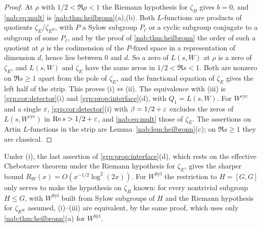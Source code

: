 \begin{proof}
At $\rho$ with $1/2<\Re\rho<1$ the Riemann hypothesis for $\zeta_B$ gives $b=0$, and
\eqref{nab:eq:mult} is \cref{nab:thm:heilbronn}(a),(b). Both $L$-functions are products of
quotients $\zeta_E/\zeta_{E^P}$, with $P$ a Sylow subgroup $P_\ell$ or a cyclic subgroup
conjugate to a subgroup of some $P_\ell$, and by the proof of \cref{nab:thm:heilbronn} the order of such a quotient at
$\rho$ is the codimension of the $P$-fixed space in a representation of dimension $d$,
hence lies between $0$ and $d$. So a zero of $L(s,W)$ at $\rho$ is a zero of $\zeta_E$, and
$L(s,W)$ and $\zeta_E$ have the same zeros in $1/2<\Re s<1$. Both are nonzero on $\Re s\ge1$
apart from the pole of $\zeta_E$, and the functional equation of $\zeta_E$ gives the left
half of the strip. This proves (i)$\Leftrightarrow$(ii). The equivalence with (iii) is
\cref{grp:cor:detector}(i) and \cref{grp:prop:interface}(d), with $Q_1=L(s,W)$. For
$W^{\mathrm{cyc}}$ and a single $\varepsilon$, \cref{grp:cor:detector}(i) with $\beta=1/2+\varepsilon$
excludes the zeros of
$L(s,W^{\mathrm{cyc}})$ in $\operatorname{Re} s>1/2+\varepsilon$, and \eqref{nab:eq:mult} those of $\zeta_E$. The
assertions on Artin $L$-functions in the strip are Lemma~\ref{nab:lem:heilbronn}(c); on
$\Re s\ge1$ they are classical.
\end{proof}

Under (i), the last assertion of \cref{grp:prop:interface}(d), which rests on the
effective Chebotarev theorem under the Riemann hypothesis for $\zeta_E$, gives the sharper
bound $R_W(x)=O(x^{-1/2}\log^2(2x))$. For $W^{\mathrm{Syl}}$ the restriction to $H=[G,G]$ only
serves to make the hypothesis on $\zeta_B$ known: for every nontrivial subgroup $H\le G$,
with $W^{\mathrm{Syl}}$ built from Sylow subgroups of $H$ and the Riemann hypothesis for
$\zeta_{E^H}$ assumed, (i)--(iii) are equivalent, by the same proof, which uses only
\cref{nab:thm:heilbronn}(a) for $W^{\mathrm{Syl}}$.

